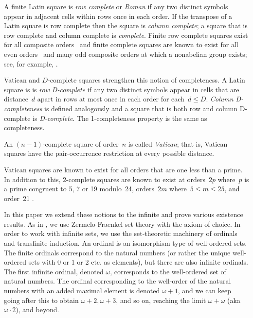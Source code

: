 \documentclass[12pt,a4paper]{article}
\begin{document}
A finite Latin square is {\em row complete} or {\em Roman} if  any two distinct symbols appear in adjacent cells within rows once in each order.  If the transpose of a Latin square is row complete then the square is {\em column complete}; a square that is row complete and column complete is {\em complete}.  Finite row complete squares exist for all composite orders~\cite{Higham98} and finite complete squares are known to exist for all even orders~\cite{Gordon61} and many odd composite orders at which a nonabelian group exists; see, for example, \cite{Ollis14}.

Vatican and $D$-complete  squares strengthen this notion of completeness. 
A Latin square is is {\em row D-complete} if any two distinct symbols appear in cells that are distance~$d$ apart in rows at most once in each order for each~$d \leq D$. {\em Column D-completeness} is defined analogously and a square that is both row and column D-complete is {\em D-complete}.  The 1-completeness property is the same as completeness.

An $(n-1)$-complete square of order~$n$ is called {\em Vatican}; that is, Vatican squares have the pair-occurrence restriction at every possible distance.

Vatican squares are known to exist for all orders that are one less than a prime.  In addition to this, 2-complete squares are known to exist at orders~$2p$ where~$p$ is a prime congruent to 5, 7 or 19 modulo~24, orders~$2m$ where~$5 \leq m \leq 25$, and order~21 \cite{TuscanCRC,OllisTFSG}.


In this paper we extend these notions to the infinite and prove various existence results.  As in \cite{CW02}, we use Zermelo-Fraenkel set theory with the axiom of choice. In order to work with infinite sets, we use the set-theoretic machinery of ordinals and transfinite induction. An ordinal is an isomorphism type of well-ordered sets. The finite ordinals correspond to the natural numbers (or rather
the unique well-ordered sets with 0 or 1 or 2 etc. as elements), but there are also infinite ordinals.
The first infinite ordinal, denoted $\omega$, corresponds to the well-ordered set of natural numbers.
The ordinal corresponding to the well-order of the natural numbers with an added maximal element is
denoted $\omega+1$, and we can keep going after this to obtain $\omega+2, \omega+3$, and so on, reaching the limit $\omega+\omega$ (aka $\omega\cdot 2$), and beyond. 
\end{document}
